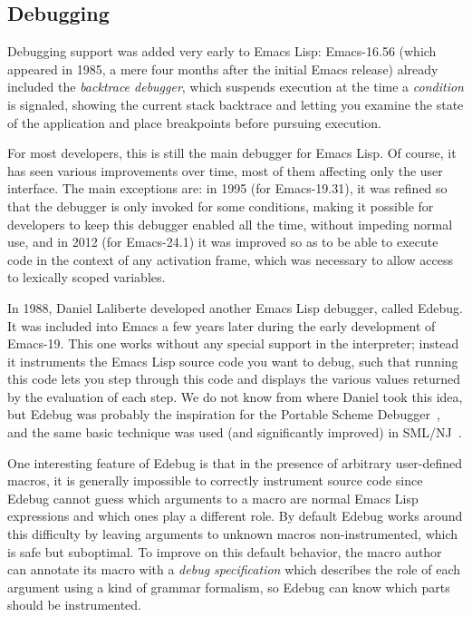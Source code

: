 \documentclass[format=acmsmall, review]{acmart}
\newcommand \Elisp {Emacs Lisp}
\begin{document}
\subsection{Debugging}
\label{sec:debugger}

Debugging support was added very early to \Elisp: Emacs-16.56 (which
appeared in 1985, a mere four months after the initial Emacs release) already
included the \emph{backtrace debugger}, which suspends execution at the time
a \emph{condition} is signaled, showing the current stack backtrace and
letting you examine the state of the application and place breakpoints
before pursuing execution.

For most developers, this is still the main debugger for \Elisp{}.
Of course, it has seen various improvements over time, most of them
affecting only the user interface.  The main exceptions are:
in 1995 (for Emacs-19.31), it was refined so that the debugger is only
invoked for some conditions, making it possible for developers to keep this
debugger enabled all the time, without impeding normal use, and in 2012
(for Emacs-24.1) it was improved so as to be able to execute code in the
context of any activation frame, which was necessary to allow access to
lexically scoped variables.

In 1988, Daniel Laliberte developed another \Elisp{} debugger, called
Edebug.  It was included into Emacs a few years later during the early
development of Emacs-19.  This one works without any special support in the
interpreter; instead it instruments the \Elisp{} source code you want to
debug, such that running this code lets you step through this code and
displays the various values returned by the evaluation of each step.  We do
not know from where Daniel took this idea, but Edebug was probably the
inspiration for the Portable Scheme Debugger~\cite{Kellomaki93}, and the
same basic technique was used (and significantly improved) in
SML/NJ~\cite{Tolmach90}.

One interesting feature of Edebug is that in the presence of arbitrary
user-defined macros, it is generally impossible to correctly instrument
source code since Edebug cannot guess which arguments to a macro are normal
\Elisp{} expressions and which ones play a different role.  By default
Edebug works around this difficulty by leaving arguments to unknown macros
non-instrumented, which is safe but suboptimal.  To improve on this default
behavior, the macro author can annotate its macro with a \emph{debug
  specification} which describes the role of each argument using a kind of
grammar formalism, so Edebug can know which parts should be instrumented.
\end{document}
